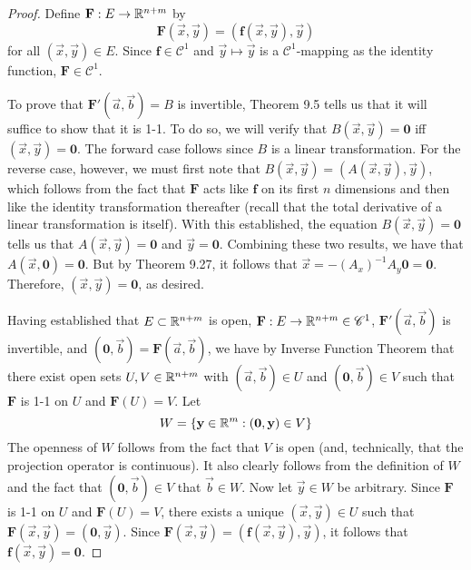 \documentclass[../notes.tex]{subfiles}
\begin{document}
\begin{itemize}
\begin{proof}
        Define $\mathbf{F}:E\to\mathbb{R}^{n+m}$ by
        \begin{equation*}
            \mathbf{F}(\vec{x},\vec{y}) = (\mathbf{f}(\vec{x},\vec{y}),\vec{y})
        \end{equation*}
        for all $(\vec{x},\vec{y})\in E$. Since $\mathbf{f}\in\mathscr{C}^1$ and $\vec{y}\mapsto\vec{y}$ is a $\mathscr{C}^1$-mapping as the identity function, $\mathbf{F}\in\mathscr{C}^1$.\par
        To prove that $\mathbf{F}'(\vec{a},\vec{b})=B$ is invertible, Theorem 9.5 tells us that it will suffice to show that it is 1-1. To do so, we will verify that $B(\vec{x},\vec{y})=\bm{0}$ iff $(\vec{x},\vec{y})=\bm{0}$. The forward case follows since $B$ is a linear transformation. For the reverse case, however, we must first note that $B(\vec{x},\vec{y})=(A(\vec{x},\vec{y}),\vec{y})$, which follows from the fact that $\mathbf{F}$ acts like $\mathbf{f}$ on its first $n$ dimensions and then like the identity transformation thereafter (recall that the total derivative of a linear transformation is itself). With this established, the equation $B(\vec{x},\vec{y})=\bm{0}$ tells us that $A(\vec{x},\vec{y})=\bm{0}$ and $\vec{y}=\bm{0}$. Combining these two results, we have that $A(\vec{x},\bm{0})=\bm{0}$. But by Theorem 9.27, it follows that $\vec{x}=-(A_x)^{-1}A_y\bm{0}=\bm{0}$. Therefore, $(\vec{x},\vec{y})=\bm{0}$, as desired.\par
        Having established that $E\subset\mathbb{R}^{n+m}$ is open, $\mathbf{F}:E\to\mathbb{R}^{n+m}\in\mathscr{C}^1$, $\mathbf{F}'(\vec{a},\vec{b})$ is invertible, and $(\bm{0},\vec{b})=\mathbf{F}(\vec{a},\vec{b})$, we have by Inverse Function Theorem that there exist open sets $U,V\in\mathbb{R}^{n+m}$ with $(\vec{a},\vec{b})\in U$ and $(\bm{0},\vec{b})\in V$ such that $\mathbf{F}$ is 1-1 on $U$ and $\mathbf{F}(U)=V$. Let
        \begin{equation*}
            W = \{\mathbf{y}\in\mathbb{R}^m:(\bm{0},\mathbf{y})\in V\}
        \end{equation*}
        The openness of $W$ follows from the fact that $V$ is open (and, technically, that the projection operator is continuous). It also clearly follows from the definition of $W$ and the fact that $(\bm{0},\vec{b})\in V$ that $\vec{b}\in W$. Now let $\vec{y}\in W$ be arbitrary. Since $\mathbf{F}$ is 1-1 on $U$ and $\mathbf{F}(U)=V$, there exists a unique $(\vec{x},\vec{y})\in U$ such that $\mathbf{F}(\vec{x},\vec{y})=(\bm{0},\vec{y})$. Since $\mathbf{F}(\vec{x},\vec{y})=(\mathbf{f}(\vec{x},\vec{y}),\vec{y})$, it follows that $\mathbf{f}(\vec{x},\vec{y})=\bm{0}$.\par\medskip

\end{proof}
\end{itemize}
\end{document}
